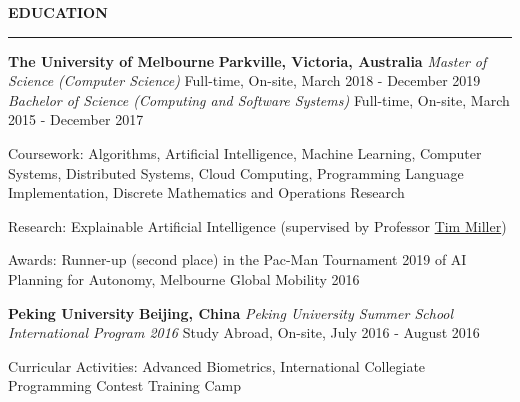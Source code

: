 \documentclass{cv}
\begin{document}
\smallskip


\textbf{\uppercase{Education}}
\sectionlineskip
\hrule height 0.6pt
\begin{list}{}{\setlength{\leftmargin}{0pt}}
\itemsep 2.0pt
\item
    \textbf{The University of Melbourne} \hfill \textbf{Parkville, Victoria, Australia}%
    \vspace{1.0pt} \newline
    {\textit{Master of Science (Computer Science)}} \hfill {Full-time, On-site, March 2018 - December 2019}%
    \newline
    {\textit{Bachelor of Science (Computing and Software Systems)}} \hfill {Full-time, On-site, March 2015 - December 2017}%
    \begin{list}{\raisebox{2.0pt}{\tiny$\bullet$}\space}{\setlength{\leftmargin}{11.2pt}}
        \itemsep -4.0pt \vspace{-4.0pt}
        \item Coursework: Algorithms, Artificial Intelligence, Machine Learning, Computer Systems, Distributed Systems, Cloud Computing, Programming Language Implementation, Discrete Mathematics and Operations Research
        \item Research: Explainable Artificial Intelligence (supervised by Professor \href{https://eecs.uq.edu.au/profile/9477/tim-miller}{Tim Miller})
        \item Awards: Runner-up (second place) in the Pac-Man Tournament 2019 of AI Planning for Autonomy, Melbourne Global Mobility 2016
    \end{list}
\item
    \textbf{Peking University} \hfill \textbf{Beijing, China}%
    \vspace{1.0pt} \newline 
    {\textit{Peking University Summer School International Program 2016}} \hfill {Study Abroad, On-site, July 2016 - August 2016}%
    \begin{list}{\raisebox{2.0pt}{\tiny$\bullet$}\space}{\setlength{\leftmargin}{11.2pt}}
        \itemsep -4.0pt \vspace{-4.0pt}
        \item Curricular Activities: Advanced Biometrics, International Collegiate Programming Contest Training Camp
    \end{list}
\end{list}
\end{document}
